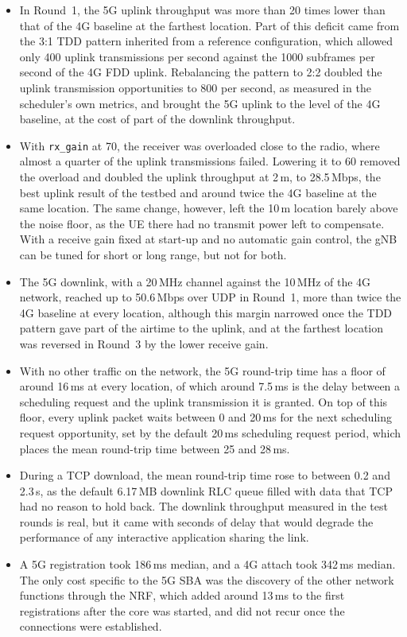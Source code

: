 \begin{itemize}
    \item In Round~1, the 5G uplink throughput was more than 20 times lower than that of the 4G baseline at the farthest location. Part of this deficit came from the 3:1 \gls{TDD} pattern inherited from a reference configuration, which allowed only 400 uplink transmissions per second against the 1000 subframes per second of the 4G \gls{FDD} uplink. Rebalancing the pattern to 2:2 doubled the uplink transmission opportunities to 800 per second, as measured in the scheduler's own metrics, and brought the 5G uplink to the level of the 4G baseline, at the cost of part of the downlink throughput.

    \item With \texttt{rx\_gain} at 70, the receiver was overloaded close to the radio, where almost a quarter of the uplink transmissions failed. Lowering it to 60 removed the overload and doubled the uplink throughput at 2\,m, to 28.5\,Mbps, the best uplink result of the testbed and around twice the 4G baseline at the same location. The same change, however, left the 10\,m location barely above the noise floor, as the \gls{UE} there had no transmit power left to compensate. With a receive gain fixed at start-up and no automatic gain control, the \gls{gNB} can be tuned for short or long range, but not for both.

    \item The 5G downlink, with a 20\,MHz channel against the 10\,MHz of the 4G network, reached up to 50.6\,Mbps over UDP in Round~1, more than twice the 4G baseline at every location, although this margin narrowed once the \gls{TDD} pattern gave part of the airtime to the uplink, and at the farthest location was reversed in Round~3 by the lower receive gain.

    \item With no other traffic on the network, the 5G round-trip time has a floor of around 16\,ms at every location, of which around 7.5\,ms is the delay between a scheduling request and the uplink transmission it is granted. On top of this floor, every uplink packet waits between 0 and 20\,ms for the next scheduling request opportunity, set by the default 20\,ms scheduling request period, which places the mean round-trip time between 25 and 28\,ms.

    \item During a TCP download, the mean round-trip time rose to between 0.2 and 2.3\,s, as the default 6.17\,MB downlink \gls{RLC} queue filled with data that TCP had no reason to hold back. The downlink throughput measured in the test rounds is real, but it came with seconds of delay that would degrade the performance of any interactive application sharing the link.

    \item A 5G registration took 186\,ms median, and a 4G attach took 342\,ms median. The only cost specific to the 5G \gls{SBA} was the discovery of the other network functions through the \gls{NRF}, which added around 13\,ms to the first registrations after the core was started, and did not recur once the connections were established.
\end{itemize}

